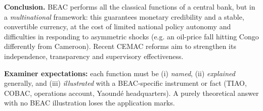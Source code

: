 \documentclass[11pt]{article}
\begin{document}
\begin{corrige}
\textbf{Conclusion.} BEAC performs all the classical functions of a central bank, but in a \emph{multinational} framework: this guarantees monetary credibility and a stable, convertible currency, at the cost of limited national policy autonomy and difficulties in responding to asymmetric shocks (e.g. an oil-price fall hitting Congo differently from Cameroon). Recent CEMAC reforms aim to strengthen its independence, transparency and supervisory effectiveness.

\textbf{Examiner expectations:} each function must be (i) \emph{named}, (ii) \emph{explained} generally, and (iii) \emph{illustrated} with a BEAC-specific instrument or fact (TIAO, COBAC, operations account, Yaoundé headquarters). A purely theoretical answer with no BEAC illustration loses the application marks.
\end{corrige}
\end{document}
